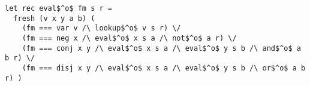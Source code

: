 \lstset{language=ocanren1}

\begin{lstlisting}
let rec eval$^o$ fm s r =
  fresh (v x y a b) (
    (fm === var v /\ lookup$^o$ v s r) \/
    (fm === neg x /\ eval$^o$ x s a /\ not$^o$ a r) \/
    (fm === conj x y /\ eval$^o$ x s a /\ eval$^o$ y s b /\ and$^o$ a b r) \/
    (fm === disj x y /\ eval$^o$ x s a /\ eval$^o$ y s b /\ or$^o$ a b r) )
  \end{lstlisting}